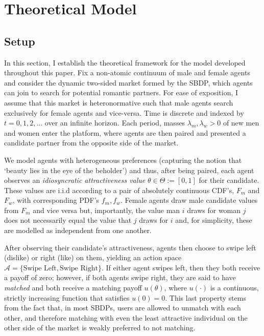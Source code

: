 \section{Theoretical Model}
\label{sec:section2}
\subsection{Setup}\label{sec:section2.1} 
In this section, I establish the theoretical framework for the model developed throughout this paper. Fix a non-atomic continuum of male and female agents and consider the dynamic two-sided market formed by the SBDP, which agents can join to search for potential romantic partners. 
For ease of exposition, I assume that this market is heteronormative such that male agents search exclusively for female agents and vice-versa. 
Time is discrete and indexed by $t=0, 1, 2, ...$ over an infinite horizon. Each period, masses $\lambda_m, \lambda_w>0$ of new men and women enter the platform, where agents are then paired and presented a candidate partner from the opposite side of the market. 

We model agents with heterogeneous preferences (capturing the notion that `beauty lies in the eye of the beholder') and thus, after being paired, each agent observes an \textit{idiosyncratic attractiveness value} $\theta \in \Theta := [0,1]$ for their candidate. 
These values are i.i.d according to a pair of absolutely continuous CDF's, $F_m$ and $F_w$, with corresponding PDF's $f_m,f_w$. 
Female agents draw male candidate values from $F_m$ and vice versa but, importantly, the value man $i$ draws for woman $j$ does not necessarily equal the value that $j$ draws for $i$ and, for simplicity, these are modelled as independent from one another.

After observing their candidate's attractiveness, agents then choose to swipe left (dislike) or right (like) on them, yielding an action space $\mathcal{A}=\{ \text{Swipe Left}, \text{Swipe Right}\}$. 
If either agent swipes left, then they both receive a payoff of zero; however, if both agents swipe right, they are said to have \textit{matched} and both receive a matching payoff $u(\theta)$, where $u(\cdot)$ is a continuous, strictly increasing function that satisfies $u(0) = 0$. 
This last property stems from the fact that, in most SBDPs, users are allowed to unmatch with each other, and therefore matching with even the least attractive individual on the other side of the market is weakly preferred to not matching. 

